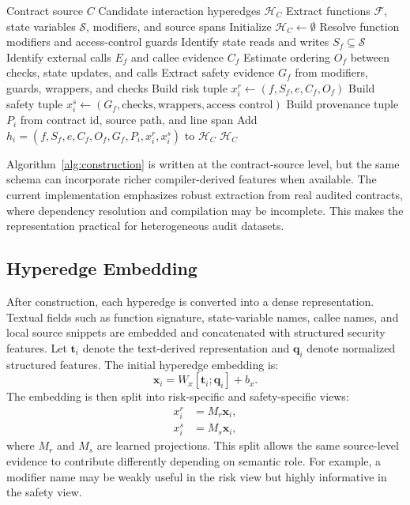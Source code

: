 \documentclass[conference]{IEEEtran}
\begin{document}
\begin{algorithm}[t]
\caption{Interaction Hyperedge Construction}
\label{alg:construction}
\begin{algorithmic}[1]
\REQUIRE Contract source $C$
\ENSURE Candidate interaction hyperedges $\mathcal{H}_C$
\STATE Extract functions $\mathcal{F}$, state variables $\mathcal{S}$, modifiers, and source spans
\STATE Initialize $\mathcal{H}_C \leftarrow \emptyset$
    \STATE Resolve function modifiers and access-control guards
    \STATE Identify state reads and writes $S_f\subseteq\mathcal{S}$
    \STATE Identify external calls $E_f$ and callee evidence $C_f$
    \STATE Estimate ordering $O_f$ between checks, state updates, and calls
    \STATE Extract safety evidence $G_f$ from modifiers, guards, wrappers, and checks
        \STATE Build risk tuple $x_i^r\leftarrow(f,S_f,e,C_f,O_f)$
        \STATE Build safety tuple $x_i^s\leftarrow(G_f,\text{checks},\text{wrappers},\text{access control})$
        \STATE Build provenance tuple $P_i$ from contract id, source path, and line span
        \STATE Add $h_i=(f,S_f,e,C_f,O_f,G_f,P_i,x_i^r,x_i^s)$ to $\mathcal{H}_C$
    \ENDFOR
\ENDFOR
\RETURN $\mathcal{H}_C$
\end{algorithmic}
\end{algorithm}

Algorithm~\ref{alg:construction} is written at the contract-source level, but the same schema can incorporate richer compiler-derived features when available. The current implementation emphasizes robust extraction from real audited contracts, where dependency resolution and compilation may be incomplete. This makes the representation practical for heterogeneous audit datasets.

\subsection{Hyperedge Embedding}

After construction, each hyperedge is converted into a dense representation. Textual fields such as function signature, state-variable names, callee names, and local source snippets are embedded and concatenated with structured security features. Let $\mathbf{t}_i$ denote the text-derived representation and $\mathbf{q}_i$ denote normalized structured features. The initial hyperedge embedding is:
\begin{equation}
\mathbf{x}_i = W_x[\mathbf{t}_i;\mathbf{q}_i]+b_x.
\end{equation}
The embedding is then split into risk-specific and safety-specific views:
\begin{align}
x_i^r &= M_r\mathbf{x}_i,\\
x_i^s &= M_s\mathbf{x}_i,
\end{align}
where $M_r$ and $M_s$ are learned projections. This split allows the same source-level evidence to contribute differently depending on semantic role. For example, a modifier name may be weakly useful in the risk view but highly informative in the safety view.
\end{document}
